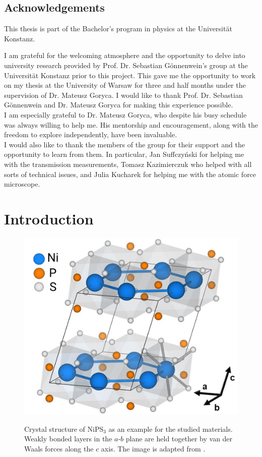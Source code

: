 \documentclass[
	twoside,
	parskip=half,
	a4paper,
]{scrbook}
\begin{document}
\clearpage
\section*{Acknowledgements}
This thesis is part of the Bachelor's program in physics at the Universität Konstanz.

I am grateful for the welcoming atmosphere and the opportunity to delve into university research provided by Prof. Dr. Sebastian Gönnenwein's group at the Universität Konstanz prior to this project.
This gave me the opportunity to work on my thesis at the University of Warsaw for three and half months under the supervision of Dr. Mateusz Goryca.
I would like to thank Prof. Dr. Sebastian Gönnenwein and Dr. Mateusz Goryca for making this experience possible.\\
I am especially grateful to Dr. Mateusz Goryca, who despite his busy schedule was always willing to help me.
His mentorship and encouragement, along with the freedom to explore independently, have been invaluable.\\
I would also like to thank the members of the group for their support and the opportunity to learn from them.
In particular, Jan Suffczyński for helping me with the transmission measurements, Tomasz Kazimierczuk who helped with all sorts of technical issues, and Julia Kucharek for helping me with the atomic force microscope.

\cleardoublepage
{
	\sffamily
	\hypersetup{hidelinks}
	\tableofcontents
}

\mainmatter

\chapter{Introduction}
\begin{figure}
	\includegraphics[width=.4\textwidth]{../../figures/crystal structures/NiPS3 3d.png}\\
	\caption{}
	Crystal structure of NiPS$_3$ as an example for the studied materials.
	Weakly bonded layers in the $a$-$b$ plane are held together by van der Waals forces along the $c$ axis.
	The image is adapted from \cite{NiPS3_coherent}.
	\label{fig:crystal structure}
\end{figure}
\end{document}
